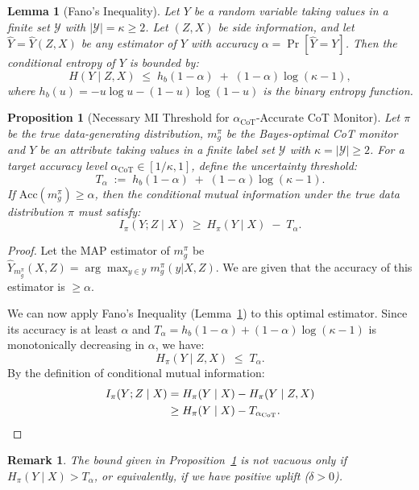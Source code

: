 \documentclass{article}
\theoremstyle{plain}
\newtheorem{proposition}[theorem]{Proposition}
\newtheorem{lemma}[theorem]{Lemma}
\newtheorem{remark}[theorem]{Remark}
\begin{document}
\begin{lemma}[Fano's Inequality]
\label{lem:fano}
Let \(Y\) be a random variable taking values in a finite set \(\mathcal Y\) with \(|\mathcal Y| = \kappa \ge 2\). 
Let \((Z,X)\) be side information, and let \(\hat Y = \hat Y(Z,X)\) be any estimator of \(Y\) with accuracy \(\alpha = \Pr[\hat Y = Y]\).
Then the conditional entropy of \(Y\) is bounded by:
\[
H(Y \mid Z,X)
\;\le\;
h_b(1-\alpha)
\;+\;
(1-\alpha)\log(\kappa-1),
\]
where \(h_b(u) = -u\log u - (1-u)\log(1-u)\) is the binary entropy function.
\end{lemma}

\begin{proposition}[Necessary MI Threshold for \(\alpha_{\text{CoT}}\)-Accurate CoT Monitor]
\label{prop:alpha_monitorability_necessary}
Let \(\pi\) be the true data-generating distribution, \(m_g^\pi\) be the Bayes-optimal CoT monitor and \(Y\) be an attribute taking values in a finite label set \(\mathcal Y\) with \(\kappa=|\mathcal Y|\ge 2\).
For a target accuracy level \(\alpha_{\text{CoT}}\in[1/\kappa,1]\), define the uncertainty threshold:
\[
T_{\alpha}\;:=\;h_b(1-\alpha)\;+\;(1-\alpha)\log(\kappa-1).
\]
If $\mathrm{Acc}(m_g^\pi) \ge \alpha$, then the conditional mutual information under the true data distribution $\pi$ must satisfy:
\[
I_{\pi}(Y;Z\mid X)\ \ge\ H_{\pi}(Y\mid X)\;-\;T_{\alpha}.
\]
\end{proposition}
\begin{proof}
Let the MAP estimator of $m_g^\pi$ be $\hat{Y}_{m_g^{\pi}}(X,Z) = \arg\max_{y \in \mathcal{Y}} m_g^{\pi}(y|X,Z)$. 
We are given that the accuracy of this estimator is $\ge \alpha$.

We can now apply Fano's Inequality (Lemma~\ref{lem:fano}) to this optimal estimator.
Since its accuracy is at least $\alpha$ and $T_\alpha = h_b(1-\alpha) + (1-\alpha)\log(\kappa-1)$ is monotonically decreasing in $\alpha$, we have:
\[
H_{\pi}(Y\mid Z,X) \;\le\; T_{\alpha}.
\]
By the definition of conditional mutual information:
\begin{align*}
I_{\pi}(Y;Z\mid X)
&= H_{\pi}(Y\mid X) - H_{\pi}(Y\mid Z,X) \\
&\ge H_{\pi}(Y\mid X) - T_{\alpha_{\text{CoT}}}.\qedhere
\end{align*}
\end{proof}

\begin{remark}
The bound given in Proposition~\ref{prop:alpha_monitorability_necessary} is not vacuous only if $H_{\pi}(Y\mid X) > T_{\alpha}$, or equivalently, if we have positive uplift ($\delta > 0$).
\end{remark}
\end{document}
